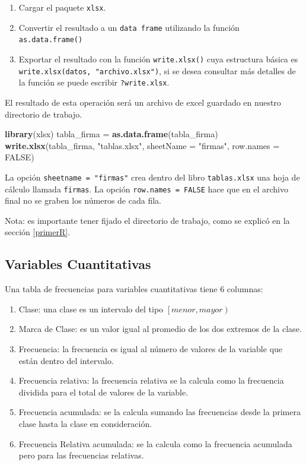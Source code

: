 \documentclass[]{book}
\newenvironment{Shaded}{\begin{snugshade}}{\end{snugshade}}
\newcommand{\DataTypeTok}[1]{\textcolor[rgb]{0.13,0.29,0.53}{#1}}
\newcommand{\KeywordTok}[1]{\textcolor[rgb]{0.13,0.29,0.53}{\textbf{#1}}}
\newcommand{\NormalTok}[1]{#1}
\newcommand{\OtherTok}[1]{\textcolor[rgb]{0.56,0.35,0.01}{#1}}
\newcommand{\StringTok}[1]{\textcolor[rgb]{0.31,0.60,0.02}{#1}}
\providecommand{\tightlist}{%
  \setlength{\itemsep}{0pt}\setlength{\parskip}{0pt}}
\begin{document}
\begin{enumerate}
\def\labelenumi{\arabic{enumi}.}
\tightlist
\item
  Cargar el paquete \texttt{xlsx}.
\item
  Convertir el resultado a un \texttt{data\ frame} utilizando la función \texttt{as.data.frame()}
\item
  Exportar el resultado con la función \texttt{write.xlsx()} cuya estructura básica es \texttt{write.xlsx(datos,\ "archivo.xlsx")}, si se desea consultar más detalles de la función se puede escribir \texttt{?write.xlsx}.
\end{enumerate}

El resultado de esta operación será un archivo de excel guardado en nuestro directorio de trabajo.

\begin{Shaded}
\begin{Highlighting}[]
\KeywordTok{library}\NormalTok{(xlsx)}
\NormalTok{tabla_firma =}\StringTok{ }\KeywordTok{as.data.frame}\NormalTok{(tabla_firma)}
\KeywordTok{write.xlsx}\NormalTok{(tabla_firma, }\StringTok{"tablas.xlsx"}\NormalTok{, }\DataTypeTok{sheetName =} \StringTok{"firmas"}\NormalTok{, }\DataTypeTok{row.names =} \OtherTok{FALSE}\NormalTok{)}
\end{Highlighting}
\end{Shaded}

La opción \texttt{sheetname\ =\ "firmas"} crea dentro del libro \texttt{tablas.xlsx} una hoja de cálculo llamada \texttt{firmas}. La opción \texttt{row.names\ =\ FALSE} hace que en el archivo final no se graben los números de cada fila.

Nota: es importante tener fijado el directorio de trabajo, como se explicó en la sección \ref{primerR}.

\hypertarget{variables-cuantitativas}{%
\subsection{Variables Cuantitativas}\label{variables-cuantitativas}}

Una tabla de frecuencias para variables cuantitativas tiene 6 columnas:

\begin{enumerate}
\def\labelenumi{\arabic{enumi}.}
\tightlist
\item
  Clase: una clase es un intervalo del tipo \(\left[ menor, mayor \right)\)
\item
  Marca de Clase: es un valor igual al promedio de los dos extremos de la clase.
\item
  Frecuencia: la frecuencia es igual al número de valores de la variable que están dentro del intervalo.
\item
  Frecuencia relativa: la frecuencia relativa se la calcula como la frecuencia dividida para el total de valores de la variable.
\item
  Frecuencia acumulada: se la calcula sumando las frecuencias desde la primera clase hasta la clase en consideración.
\item
  Frecuencia Relativa acumulada: se la calcula como la frecuencia acumulada pero para las frecuencias relativas.
\end{enumerate}
\end{document}
